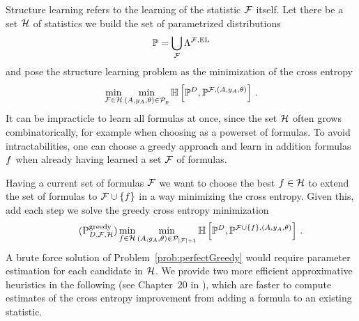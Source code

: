 
Structure learning refers to the learning of the statistic $\mathcal{F}$ itself.
Let there be a set $\mathcal{H}$ of statistics we build the set of parametrized distributions
\begin{align*}
    \mathbb{P} = \bigcup_{\mathcal{F}} \Lambda^{\mathcal{F},\mathrm{EL}}
\end{align*}
and pose the structure learning problem as the minimization of the cross entropy
\begin{align*}
    \min_{\mathcal{F}\in\mathcal{H}} \min_{(A,y_{A},\theta)\in\mathcal{P}_{p}} \mathbb{H}\left[\mathbb{P}^{D},\mathbb{P}^{\mathcal{F},(A,y_{A},\theta)}\right] \, .
\end{align*}
It can be impracticle to learn all formulas at once, since the set $\mathcal{H}$ often grows combinatorically, for example when choosing as a powerset of formulas.
To avoid intractabilities, one can choose a greedy approach and learn in addition formulas $f$ when already having learned a set $\mathcal{F}$ of formulas.


Having a current set of formulas $\mathcal{F}$ we want to choose the best $f\in\mathcal{H}$ to extend the set of formulas to $\mathcal{F}\cup\{f\}$ in a way minimizing the cross entropy.
Given this, add each step we solve the greedy cross entropy minimization
\begin{align}
    \label{prob:perfectGreedy}\tag{$\probtagtypeinst{\mathrm{greedy}}{\datamap,\mlnstat,\greedyhypothesis}$}
    \min_{\formula\in\greedyhypothesis} \min_{\hybridparam\in\hybridparamsetofdim{\cardof{\mlnstat}+1}}
    \centropyof{\empdistribution}{\probof{\mlnstat\cup\{\formula\},\hybridparam}} \, .
\end{align}
A brute force solution of Problem~\eqref{prob:perfectGreedy} would require parameter estimation for each candidate in $\mathcal{H}$.
We provide two more efficient approximative heuristics in the following (see Chapter~20 in \cite{koller_probabilistic_2009}), which are faster to compute estimates of the cross entropy improvement from adding a formula to an existing statistic.


